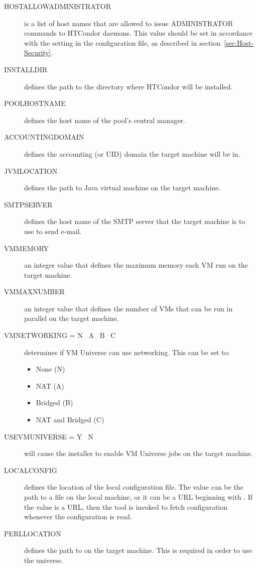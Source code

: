 \begin{description}
\item[HOSTALLOWADMINISTRATOR]
is a list of host names that are allowed to issue ADMINISTRATOR commands to
HTCondor daemons. This value should be set in accordance with the
 setting in the configuration file, 
as described in
section~\ref{sec:Host-Security}.

\item[INSTALLDIR]
defines the path to the directory where HTCondor will be installed. 

\item[POOLHOSTNAME]
defines the host name of the pool's central manager. 

\item[ACCOUNTINGDOMAIN] 
defines the accounting (or UID) domain the target machine will be in.

\item[JVMLOCATION]
defines the path to Java virtual machine on the target machine.

\item[SMTPSERVER]
defines the host name of the SMTP server that the target machine is to
use to send e-mail.

\item [VMMEMORY]
an integer value that defines the maximum memory each VM run on the target
machine.

\item [VMMAXNUMBER]
an integer value that defines the number of VMs that can be run in parallel
on the target machine.

\item [VMNETWORKING = \lt{} N \Bar{}\ A \Bar{}\ B \Bar{}\ C \gt{}]
determines if VM Universe can use networking. This can be set to:
\begin{itemize}
\item None (N)
\item NAT (A)
\item Bridged (B)
\item NAT and Bridged (C)
\end{itemize}

\item [USEVMUNIVERSE = \lt{} Y \Bar{}\ N \gt{}]
will cause the installer to enable VM Universe jobs on the target machine.

\item[LOCALCONFIG]
defines the location of the local configuration file.
The value can be the path to a file on the local machine, 
or it can be a URL beginning with .
If the value is a URL, 
then the  tool is invoked to fetch configuration
whenever the configuration is read.

\item[PERLLOCATION]
defines the path to  on the target machine. This is required in
order to use the  universe.
\end{description}


